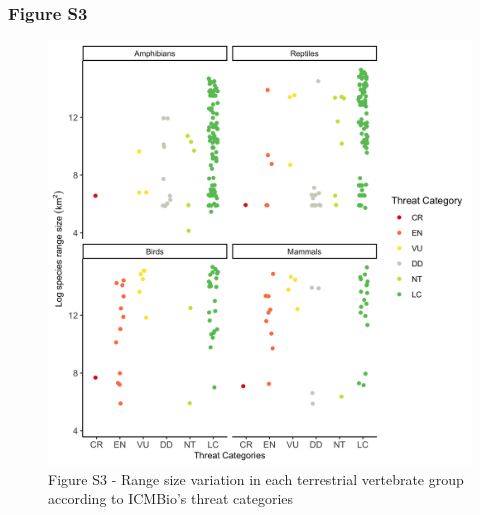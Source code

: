 \documentclass[12pt,openright,oneside,a4paper,english]{abntex2}
\begin{document}
\pagebreak

\subsubsection*{Figure S3}\label{fig:fig1-s3}
\begin{figure}[H]
	\centering
	\includegraphics[width=160mm]{Fig c1-s3}
	\caption*{\small Figure S3 - Range size variation in each terrestrial vertebrate group according to ICMBio’s threat categories}
\end{figure}

\pagebreak
\end{document}
